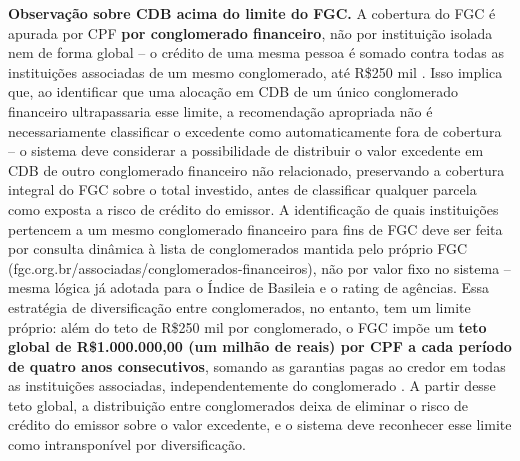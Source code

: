 \textbf{Observa\c{c}\~ao sobre CDB acima do limite do FGC.} A cobertura
do FGC \'e apurada por CPF \textbf{por conglomerado financeiro}, n\~ao
por institui\c{c}\~ao isolada nem de forma global -- o cr\'edito de uma
mesma pessoa \'e somado contra todas as institui\c{c}\~oes associadas de
um mesmo conglomerado, at\'e R\$250 mil \autocite{resolucaocmn4222}.
Isso implica que, ao identificar que uma aloca\c{c}\~ao em CDB de um
\'unico conglomerado financeiro ultrapassaria esse limite, a
recomenda\c{c}\~ao apropriada n\~ao \'e necessariamente classificar o
excedente como automaticamente fora de cobertura -- o sistema deve
considerar a possibilidade de distribuir o valor excedente em CDB de
outro conglomerado financeiro n\~ao relacionado, preservando a
cobertura integral do FGC sobre o total investido, antes de classificar
qualquer parcela como exposta a risco de cr\'edito do emissor. A
identifica\c{c}\~ao de quais institui\c{c}\~oes pertencem a um mesmo
conglomerado financeiro para fins de FGC deve ser feita por consulta
din\^amica \`a lista de conglomerados mantida pelo pr\'oprio FGC
(fgc.org.br/associadas/conglomerados-financeiros), n\~ao por valor
fixo no sistema -- mesma l\'ogica j\'a adotada para o \'Indice de
Basileia e o rating de ag\^encias. Essa estrat\'egia de diversifica\c{c}\~ao
entre conglomerados, no entanto, tem um limite pr\'oprio: al\'em do teto
de R\$250 mil por conglomerado, o FGC imp\~oe um \textbf{teto global de
R\$1.000.000,00 (um milh\~ao de reais) por CPF a cada per\'iodo de
quatro anos consecutivos}, somando as garantias pagas ao credor em
todas as institui\c{c}\~oes associadas, independentemente do
conglomerado \autocite{resolucaocmn4222}. A partir desse teto global, a
distribui\c{c}\~ao entre conglomerados deixa de eliminar o risco de
cr\'edito do emissor sobre o valor excedente, e o sistema deve
reconhecer esse limite como intranspon\'ivel por diversifica\c{c}\~ao.



